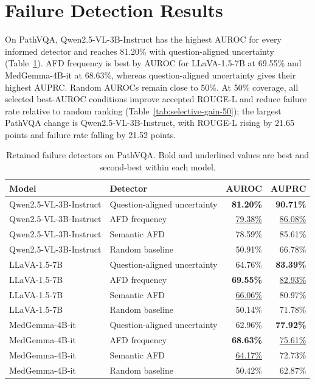 \section{Failure Detection Results}

On PathVQA, Qwen2.5-VL-3B-Instruct has the highest AUROC for every informed detector and reaches 81.20\% with question-aligned uncertainty (Table~\ref{tab:pathvqa-failure-detection}). AFD frequency is best by AUROC for LLaVA-1.5-7B at 69.55\% and MedGemma-4B-it at 68.63\%, whereas question-aligned uncertainty gives their highest AUPRC. Random AUROCs remain close to 50\%. At 50\% coverage, all selected best-AUROC conditions improve accepted ROUGE-L and reduce failure rate relative to random ranking (Table~\ref{tab:selective-gain-50}); the largest PathVQA change is Qwen2.5-VL-3B-Instruct, with ROUGE-L rising by 21.65 points and failure rate falling by 21.52 points.

\begin{table}[htbp]
    \centering
    \caption{Retained failure detectors on PathVQA. Bold and underlined values are best and second-best within each model.}
    \label{tab:pathvqa-failure-detection}
    \begin{tabularx}{\textwidth}{XXrr}
        \toprule Model & Detector & AUROC & AUPRC \\ \midrule
        Qwen2.5-VL-3B-Instruct & Question-aligned uncertainty & \textbf{81.20\%} & \textbf{90.71\%} \\
        Qwen2.5-VL-3B-Instruct & AFD frequency & \underline{79.38\%} & \underline{86.08\%} \\
        Qwen2.5-VL-3B-Instruct & Semantic AFD & 78.59\% & 85.61\% \\
        Qwen2.5-VL-3B-Instruct & Random baseline & 50.91\% & 66.78\% \\ \midrule
        LLaVA-1.5-7B & Question-aligned uncertainty & 64.76\% & \textbf{83.39\%} \\
        LLaVA-1.5-7B & AFD frequency & \textbf{69.55\%} & \underline{82.93\%} \\
        LLaVA-1.5-7B & Semantic AFD & \underline{66.06\%} & 80.97\% \\
        LLaVA-1.5-7B & Random baseline & 50.14\% & 71.78\% \\ \midrule
        MedGemma-4B-it & Question-aligned uncertainty & 62.96\% & \textbf{77.92\%} \\
        MedGemma-4B-it & AFD frequency & \textbf{68.63\%} & \underline{75.61\%} \\
        MedGemma-4B-it & Semantic AFD & \underline{64.17\%} & 72.73\% \\
        MedGemma-4B-it & Random baseline & 50.42\% & 62.87\% \\ \bottomrule
    \end{tabularx}
\end{table}

